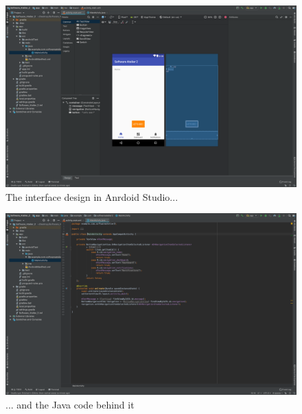 \documentclass[12pt]{scrartcl}
\begin{document}
	\begin{figure}[H]
        		\centering
       		\includegraphics[width=\textwidth]{../images/androidStudio1.png}
       		\caption{The interface design in Anrdoid Studio...}
        		\label{androirdStudio1}
	\end{figure}
	
	\begin{figure}[H]
        		\centering
       		\includegraphics[width=\textwidth]{../images/androidStudio2.png}
       		\caption{... and the Java code behind it}
        		\label{androirdStudio2}
	\end{figure}
	
\end{document}
